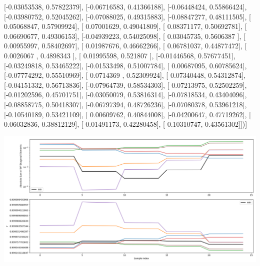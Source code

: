 \documentclass{article}
\begin{document}
       [-0.03053538,  0.57822379],
       [-0.06716583,  0.41366188],
       [-0.06448424,  0.55866424],
       [-0.03980752,  0.52045262],
       [-0.07088025,  0.49315883],
       [-0.08847277,  0.48111505],
       [ 0.05068847,  0.57909924],
       [ 0.07001629,  0.49041809],
       [ 0.08371177,  0.50692781],
       [ 0.06690677,  0.49306153],
       [-0.04939223,  0.54025098],
       [ 0.03045735,  0.5606387 ],
       [ 0.00955997,  0.58402697],
       [ 0.01987676,  0.46662266],
       [ 0.06781037,  0.44877472],
       [ 0.0026067 ,  0.4898343 ],
       [ 0.01995598,  0.521807  ],
       [-0.01446568,  0.57677451],
       [-0.03249818,  0.53465222],
       [-0.01533498,  0.51007784],
       [ 0.00687095,  0.60785624],
       [-0.07774292,  0.55510969],
       [ 0.0714369 ,  0.52309924],
       [ 0.07340448,  0.54312874],
       [-0.04151332,  0.56713836],
       [-0.07964739,  0.58534303],
       [ 0.07213975,  0.52502259],
       [-0.01202596,  0.45701751],
       [-0.03050079,  0.53816314],
       [-0.07818534,  0.43404096],
       [-0.08858775,  0.50418307],
       [-0.06797394,  0.48726236],
       [-0.07080378,  0.53961218],
       [-0.10540189,  0.53421109],
       [ 0.00609762,  0.40844008],
       [-0.04200647,  0.47719262],
       [ 0.06032836,  0.38812129],
       [ 0.01491173,  0.42280458],
       [ 0.10310747,  0.43561302]])]
\begin{center}
\includegraphics[scale=.9]{report_pickled_controls186/control_dpn_all.png}

\end{center}
\end{document}
